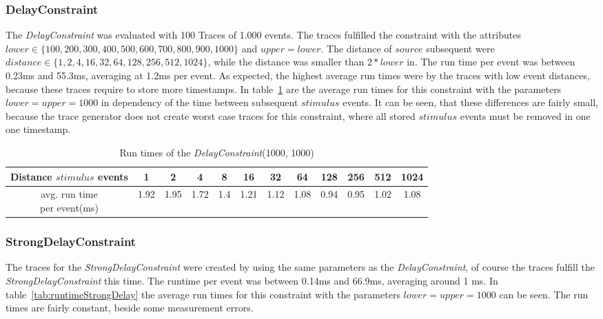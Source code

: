 \subsubsection{DelayConstraint}
	The \textit{DelayConstraint} was evaluated with 100 Traces of 1.000 events. The traces fulfilled the constraint with the attributes $lower\in\{100, 200, 300, 400, 500, 600, 700, 800, 900, 1000\}$ and $upper=lower$.  The distance of $source$ subsequent were $distance\in\{1, 2, 4, 16, 32, 64, 128, 256, 512, 1024\}$, while the distance was smaller than $2*lower$ in.  The run time per event was between 0.23ms and 55.3ms, averaging at 1.2ms per event. As expected, the highest average run times were by the traces with low event distances, because these traces require to store more timestamps. In table~\ref{tab:runtimeDelay} are the average run times for this constraint with the parameters $lower=upper=1000$ in dependency of the time between subsequent $stimulus$ events. It can be seen, that these differences are fairly small, because the trace generator does not create worst case traces for this constraint, where all stored $stimulus$ events must be removed in one one timestamp.
	\begin{table}
		\begin{tabular}{|c|c|c|c|c|c|c|c|c|c|c|c|}
			\hline 
			\makecell{Distance\\$stimulus$\\events}  & 	1	 & 2 	  & 4 	   & 8 	   & 16 	& 32 	 & 64 	  & 128    & 256 	& 512 	& 1024\\
			\hline
			\makecell{avg. run time\\per event(ms)}	& 1.92 & 1.95 & 1.72 & 1.4 & 1.21 & 1.12 & 1.08 & 0.94 & 0.95 & 1.02 & 1.08\\
			\hline
		\end{tabular}
		\centering
		\caption{Run times of the \textit{DelayConstraint}(1000, 1000)}
		\label{tab:runtimeDelay}
	\end{table}

\subsubsection{StrongDelayConstraint}
	The traces for the \textit{StrongDelayConstraint} were created by using the same parameters as the \textit{DelayConstraint}, of course the traces fulfill the \textit{StrongDelayConstraint} this time. The runtime per event was between 0.14ms and 66.9ms, averaging around 1 ms. In table~\ref{tab:runtimeStrongDelay} the average run times for this constraint with the parameters $lower=upper=1000$ can be seen. The run times are fairly constant, beside some measurement errors.

